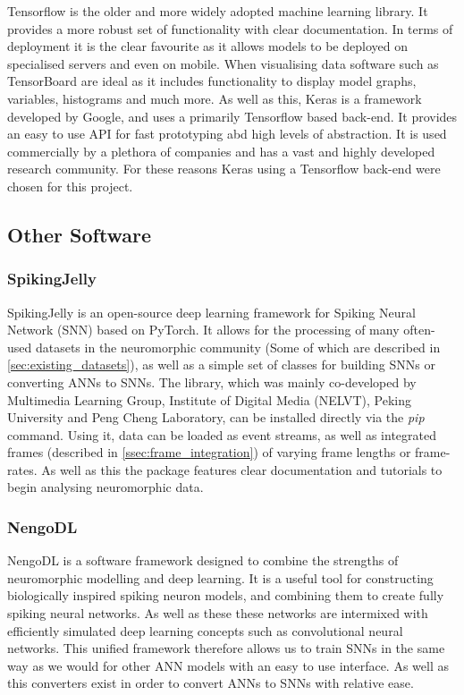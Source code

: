Tensorflow\cite{Tensorflow} is the older and more widely adopted machine learning library. It provides a more robust set of functionality with clear documentation. In terms of deployment it is the clear favourite as it allows models to be deployed on specialised servers and even on mobile. When visualising data software such as TensorBoard are ideal as it includes functionality to display model graphs, variables, histograms and much more. As well as this, Keras\cite{Keras} is a framework developed by Google, and uses a primarily Tensorflow based back-end. It provides an easy to use API for fast prototyping abd high levels of abstraction. It is used commercially by a plethora of companies and has a vast and highly developed research community. For these reasons Keras using a Tensorflow back-end were chosen for this project.

\subsection{Other Software}

\subsubsection{SpikingJelly}

SpikingJelly\cite{SpikingJelly} is an open-source deep learning framework for Spiking Neural Network (SNN) based on PyTorch. It allows for the processing of many often-used datasets in the neuromorphic community (Some of which are described in \cref{sec:existing_datasets}), as well as a simple set of classes for building SNNs or converting ANNs to SNNs. The library, which was mainly co-developed by Multimedia Learning Group, Institute of Digital Media (NELVT), Peking University and Peng Cheng Laboratory, can be installed directly via the \emph{pip} command. Using it, data can be loaded as event streams, as well as integrated frames (described in \cref{ssec:frame_integration}) of varying frame lengths or frame-rates. As well as this the package features clear documentation and tutorials to begin analysing neuromorphic data.

\subsubsection{NengoDL} \label{sssec:nengo}

NengoDL\cite{NengoDL} is a software framework designed to combine the strengths of neuromorphic modelling and deep learning. It is a useful tool for constructing biologically inspired spiking neuron models, and combining them to create fully spiking neural networks. As well as these these networks are intermixed with efficiently simulated deep learning concepts such as convolutional neural networks. This unified framework therefore allows us to train SNNs in the same way as we would for other ANN models with an easy to use interface. As well as this converters exist in order to convert ANNs to SNNs with relative ease.


